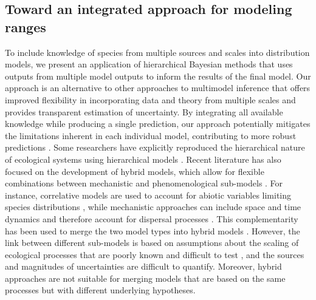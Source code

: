 \documentclass[11pt]{article}
\begin{document}
\subsection*{Toward an integrated approach for modeling ranges}
To include knowledge of species from multiple sources and scales into distribution models, we present an application of hierarchical Bayesian methods that uses outputs from multiple model outputs to inform the results of the final model.
Our approach is an alternative to other approaches to multimodel inference that offers improved flexibility in incorporating data and theory from multiple scales and provides transparent estimation of uncertainty.
By integrating all available knowledge while producing a single prediction, our approach potentially mitigates the limitations inherent in each individual model, contributing to more robust predictions \citep{Pearson2003, Guisan2005, Araujo2006, Quillet2010}.
Some researchers have explicitly reproduced the hierarchical nature of ecological systems using hierarchical models \citep[e.g.][]{Royale2008, Boulangeat2012, Catterall2012, Strigul2012, Soranno2014}. 
Recent literature has also focused on the development of hybrid models, which allow for flexible combinations between mechanistic and phenomenological sub-models \citep{Gallien2010, Thuiller2013}. 
For instance, correlative models are used to account for abiotic variables limiting species distributions \citep{Guisan2005}, while mechanistic approaches can include space and time dynamics and therefore account for dispersal processes \citep{Kearney2008}. 
This complementarity has been used to merge the two model types into hybrid models \citep[e.g.][]{Keith2008, Anderson2009, Smolik2010, Dormann2012, Boulangeat2014}. 
However, the link between different sub-models is based on assumptions about the scaling of ecological processes that are poorly known and difficult to test \citep{Gallien2010}, and the sources and magnitudes of uncertainties are difficult to quantify. 
Moreover, hybrid approaches are not suitable for merging models that are based on the same processes but with different underlying hypotheses.
\end{document}
